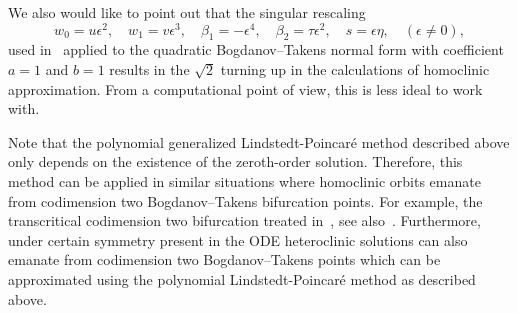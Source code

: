 We also would like to point out that the singular rescaling
\begin{equation*}
    w_0 = u \epsilon^2, \quad
    w_1 = v \epsilon^3, \quad
    \beta_1 = -\epsilon^4, \quad 
    \beta_2 = \tau \epsilon^2, \quad 
    s = \epsilon \eta, \quad (\epsilon \neq 0),
\end{equation*}
used in~\cite{Algaba_2019} applied to the quadratic Bogdanov--Takens normal form
with coefficient $a=1$ and $b=1$ results in the $\sqrt 2$ turning up in the
calculations of homoclinic approximation. From a computational point of view,
this is less ideal to work with.

\begin{remark}
    Note that the polynomial generalized Lindstedt-Poincar\'e method described
    above only depends on the existence of the zeroth-order solution.
    Therefore, this method can be applied in similar situations where
    homoclinic orbits emanate from codimension two Bogdanov--Takens bifurcation
    points. For example, the transcritical codimension two bifurcation treated
    in~\cite{Hirschberg_1991}, see also~\cite[Appendix C.2]{Bosschaert@2016}.
    Furthermore, under certain symmetry present in the ODE heteroclinic
    solutions can also emanate from codimension two Bogdanov--Takens points
    which can be approximated using the polynomial Lindstedt-Poincar\'e method
    as described above.
\end{remark}
\fi
